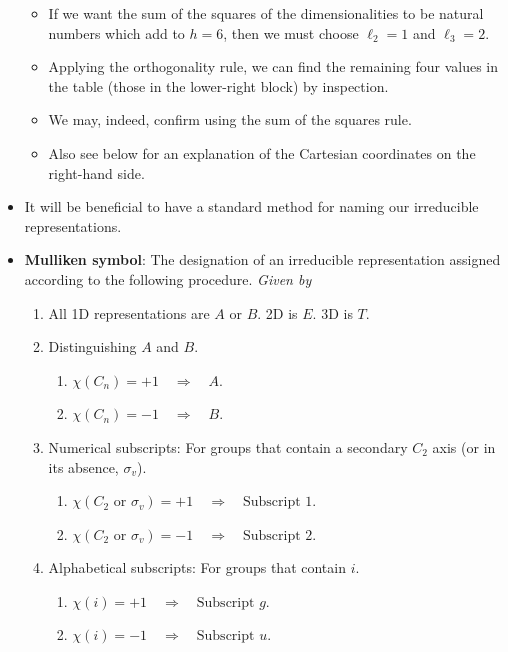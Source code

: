 \documentclass[../notes.tex]{subfiles}
\begin{document}
\begin{itemize}
\begin{itemize}
        \item If we want the sum of the squares of the dimensionalities to be natural numbers which add to $h=6$, then we must choose $\ell_2=1$ and $\ell_3=2$.
        \item Applying the orthogonality rule, we can find the remaining four values in the table (those in the lower-right block) by inspection.
        \item We may, indeed, confirm using the sum of the squares rule.
        \item Also see below for an explanation of the Cartesian coordinates on the right-hand side.
    \end{itemize}
    \item It will be beneficial to have a standard method for naming our irreducible representations.
    \item \textbf{Mulliken symbol}: The designation of an irreducible representation assigned according to the following procedure. \emph{Given by}
    \begin{enumerate}
        \item All 1D representations are $A$ or $B$. 2D is $E$. 3D is $T$.
        \item Distinguishing $A$ and $B$.
        \begin{enumerate}
            \item $\chi(C_n)=+1\quad\Longrightarrow\quad A$.
            \item $\chi(C_n)=-1\quad\Longrightarrow\quad B$.
        \end{enumerate}
        \item Numerical subscripts: For groups that contain a secondary $C_2$ axis (or in its absence, $\sigma_v$).
        \begin{enumerate}
            \item $\chi(C_2\text{ or }\sigma_v)=+1\quad\Longrightarrow\quad\text{Subscript }1$.
            \item $\chi(C_2\text{ or }\sigma_v)=-1\quad\Longrightarrow\quad\text{Subscript }2$.
        \end{enumerate}
        \item Alphabetical subscripts: For groups that contain $i$.
        \begin{enumerate}
            \item $\chi(i)=+1\quad\Longrightarrow\quad\text{Subscript }g$.
            \item $\chi(i)=-1\quad\Longrightarrow\quad\text{Subscript }u$.
        \end{enumerate}

\end{enumerate}
\end{itemize}
\end{document}

